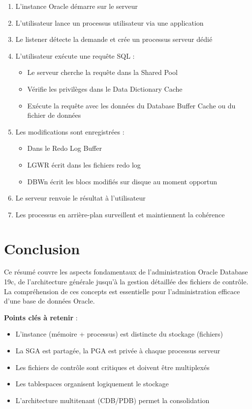\documentclass[12pt,a4paper]{article}
\begin{document}
\begin{enumerate}
    \item L'instance Oracle démarre sur le serveur
    \item L'utilisateur lance un processus utilisateur via une application
    \item Le listener détecte la demande et crée un processus serveur dédié
    \item L'utilisateur exécute une requête SQL :
    \begin{itemize}
        \item Le serveur cherche la requête dans la Shared Pool
        \item Vérifie les privilèges dans le Data Dictionary Cache
        \item Exécute la requête avec les données du Database Buffer Cache ou du fichier de données
    \end{itemize}
    \item Les modifications sont enregistrées :
    \begin{itemize}
        \item Dans le Redo Log Buffer
        \item LGWR écrit dans les fichiers redo log
        \item DBWn écrit les blocs modifiés sur disque au moment opportun
    \end{itemize}
    \item Le serveur renvoie le résultat à l'utilisateur
    \item Les processus en arrière-plan surveillent et maintiennent la cohérence
\end{enumerate}

\section{Conclusion}

Ce résumé couvre les aspects fondamentaux de l'administration Oracle Database 19c, de l'architecture générale jusqu'à la gestion détaillée des fichiers de contrôle. La compréhension de ces concepts est essentielle pour l'administration efficace d'une base de données Oracle.

\vspace{1cm}

\textbf{Points clés à retenir} :
\begin{itemize}
    \item L'instance (mémoire + processus) est distincte du stockage (fichiers)
    \item La SGA est partagée, la PGA est privée à chaque processus serveur
    \item Les fichiers de contrôle sont critiques et doivent être multiplexés
    \item Les tablespaces organisent logiquement le stockage
    \item L'architecture multitenant (CDB/PDB) permet la consolidation
\end{itemize}
\end{document}
